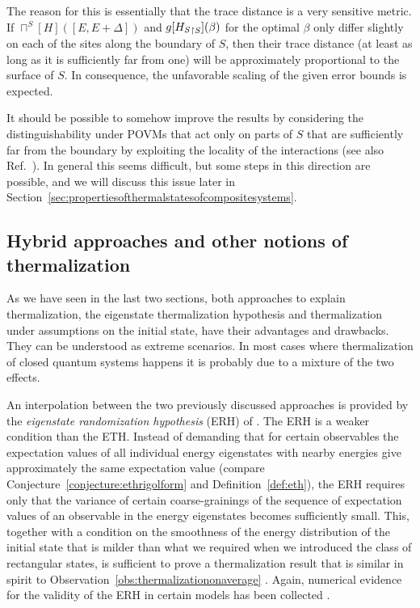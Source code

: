 \documentclass[a4paper,12pt,listof=totoc,index=totoc,bibliography=totoc,headsepline=false,headings=normal,BCOR16.153846mm,DIV12,headinclude,twoside,cleardoublepage=empty,numbers=noenddot,final]{scrreprt}
\theoremstyle{mystyle}
\numberwithin{equation}{section}
\numberwithin{figure}{section}
\numberwithin{lemma}{section}
\numberwithin{theorem}{section}
\numberwithin{corollary}{section}
\numberwithin{definition}{section}
\numberwithin{conjecture}{section}
\numberwithin{observation}{section}
\newcommand{\+}{\mkern2mu}
\renewcommand{\H}{H}
\newcommand{\rhog}{g}
\newcommand{\rhomc}{{\sqcap}}
\newcommand{\trunc}[2]{{#1}_{\upharpoonright \mathnormal{#2}}}
\DeclareMathOperator{\1}{\mathds{1}}
\begin{document}
The reason for this is essentially that the trace distance is a very sensitive metric.
If $\rhomc^S[\H]([E,E+\Delta])$ and $\rhog[\trunc{\H_S}S](\beta)$ for the optimal $\beta$ only differ slightly on each of the sites along the boundary of $S$, then their trace distance (at least as long as it is sufficiently far from one) will be approximately proportional to the surface of $S$.
In consequence, the unfavorable scaling of the given error bounds is expected.

It should be possible to somehow improve the results by considering the distinguishability under POVMs that act only on parts of $S$ that are sufficiently far from the boundary by exploiting the locality of the interactions (see also Ref.~\cite{Zhang10}).
In general this seems difficult, but some steps in this direction are possible, and we will discuss this issue later in Section~\ref{sec:propertiesofthermalstatesofcompositesystems}.


\subsection{Hybrid approaches and other notions of thermalization}
\label{sec:othernotionsandhybridapproaches}
%
As we have seen in the last two sections, both approaches to explain thermalization, the eigenstate thermalization hypothesis and thermalization under assumptions on the initial state, have their advantages and drawbacks.
They can be understood as extreme scenarios.
In most cases where thermalization of closed quantum systems happens it is probably due to a mixture of the two effects.

An interpolation between the two previously discussed approaches is provided by the \emph{eigenstate randomization hypothesis} (ERH) of \textcite{Ikeda11}.
The ERH is a weaker condition than the ETH.
Instead of demanding that for certain observables the expectation values of all individual energy eigenstates with nearby energies give approximately the same expectation value (compare Conjecture~\ref{conjecture:ethrigolform} and Definition~\ref{def:eth}), the ERH requires only that the variance of certain coarse-grainings of the sequence of expectation values of an observable in the energy eigenstates becomes sufficiently small.
This, together with a condition on the smoothness of the energy distribution of the initial state that is milder than what we required when we introduced the class of rectangular states, is sufficient to prove a thermalization result that is similar in spirit to Observation~\ref{obs:thermalizationonaverage} \cite{Ikeda11}.
Again, numerical evidence for the validity of the ERH in certain models has been collected \cite{Ikeda11}.
\end{document}
